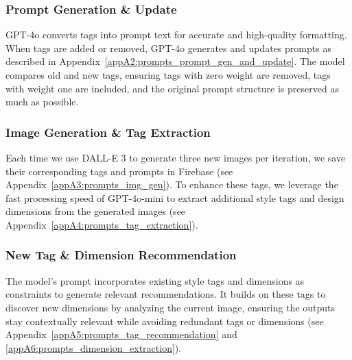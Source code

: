 \subsubsection{Prompt Generation \& Update}
GPT-4o converts tags into prompt text for accurate and high-quality formatting. When tags are added or removed, GPT-4o generates and updates prompts as described in Appendix~\ref{appA2:prompts_prompt_gen_and_update}. The model compares old and new tags, ensuring tags with zero weight are removed, tags with weight one are included, and the original prompt structure is preserved as much as possible.

\subsubsection{Image Generation \& Tag Extraction}
Each time we use DALL-E 3 to generate three new images per iteration, we save their corresponding tags and prompts in Firebase (see Appendix~\ref{appA3:prompts_img_gen}). To enhance these tags, we leverage the fast processing speed of GPT-4o-mini to extract additional style tags and design dimensions from the generated images (see Appendix~\ref{appA4:prompts_tag_extraction}).

\subsubsection{New Tag \& Dimension Recommendation}
The model’s prompt incorporates existing style tags and dimensions as constraints to generate relevant recommendations. It builds on these tags to discover new dimensions by analyzing the current image, ensuring the outputs stay contextually relevant while avoiding redundant tags or dimensions (see Appendix~\ref{appA5:prompts_tag_recommendation} and \ref{appA6:prompts_dimension_extraction}).

